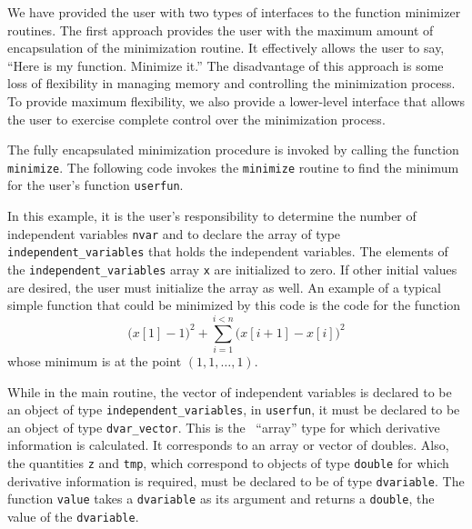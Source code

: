 \documentclass{admbmanual}
\begin{document}
We have provided the user with two types of interfaces to the function minimizer
routines. The first approach provides the user with the maximum amount of
encapsulation of the minimization routine. It effectively allows the user to
say, ``Here is my function. Minimize it.'' The disadvantage of this approach is
some loss of flexibility in managing memory and controlling the minimization
process. To provide maximum flexibility, we also provide a lower-level interface
that allows the user to exercise complete control over the minimization process.

The fully encapsulated minimization procedure is invoked by calling the function
\texttt{minimize}. The following code invokes the \texttt{minimize} routine to
find the minimum for the user's function \texttt{userfun}.


In this example, it is the user's responsibility to determine the number of
independent variables \texttt{nvar} and to declare the array of type
\texttt{independent\_variables} that holds the independent variables. The
elements of the \texttt{independent\_variables} array \texttt{x} are initialized
to zero. If other initial values are desired, the user must initialize the array
as well. An example of a typical simple function that could be minimized by this
code is the code for the function
\begin{equation*}
  \big(x[1]-1\big)^2 + \sum_{i=1}^{i<n} \Big(x[i+1]-x[i]\Big)^2
\end{equation*}
whose minimum is at the point $(1,1,\ldots,1)$.


While in the main routine, the vector of independent variables is declared to be
an object of type \texttt{independent\_variables}, in \texttt{userfun}, it must
be declared to be an object of type \texttt{dvar\_vector}. This is the \scAD\
``array'' type for which derivative information is calculated. It corresponds to
an array or vector of doubles. Also, the quantities \texttt{z} and \texttt{tmp},
which correspond to objects of type \texttt{double} for which derivative
information is required, must be declared to be of type \texttt{dvariable}. The
function \texttt{value} takes a \texttt{dvariable} as its argument and returns a
\texttt{double}, the value of the \texttt{dvariable}.
\end{document}
